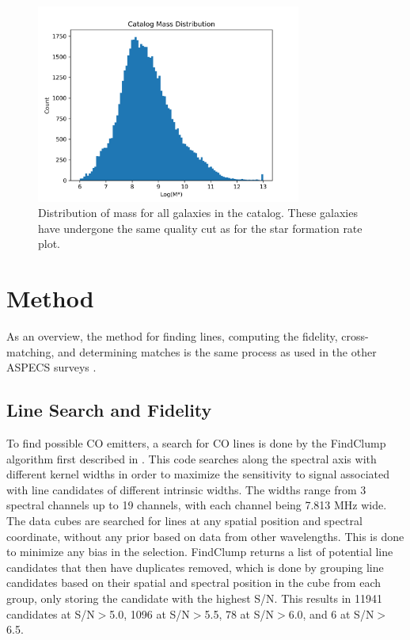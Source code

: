 \begin{figure}[!tbp]
\centering \includegraphics[width=87mm]{Survey/MAGPHYS_Mstar.png}
\caption{Distribution of mass for all galaxies in the catalog. These galaxies have undergone the same quality cut as for the star formation rate plot.}
\label{fig:MAGPHYS_Properties}
\end{figure}

\section{Method}

As an overview, the method for finding lines, computing the fidelity, cross-matching, and determining matches is the same process as used in the other ASPECS surveys \cite{walter2016alma, decarli2019alma}.

\subsection{Line Search and Fidelity}

To find possible CO emitters, a search for CO lines is done by the FindClump algorithm first described in \cite{walter2016alma}. This code searches along the spectral axis with different kernel widths in order to maximize the sensitivity to signal associated with line candidates of different intrinsic widths. The widths range from 3 spectral channels up to 19 channels, with each channel being 7.813 MHz wide. The data cubes are searched for lines at any spatial position and spectral coordinate, without any prior based on data from other wavelengths. This is done to minimize any bias in the selection. FindClump returns a list of potential line candidates that then have duplicates removed, which is done by grouping line candidates based on their spatial and spectral position in the cube from each group, only storing the candidate with the highest S/N. This results in 11941 candidates at S/N$>$5.0, 1096 at S/N$>$5.5, 78 at S/N$>$6.0, and 6 at S/N$>$6.5. 

